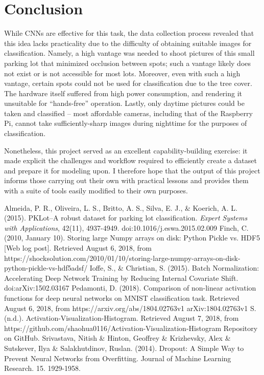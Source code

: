 \documentclass[a4paper, 11pt]{article} %
\begin{document}
\section{Conclusion}
	While CNNs are effective for this task, the data collection process 
	revealed that this idea lacks practicality due to the difficulty of 
	obtaining suitable images for classification. Namely, a high vantage was 
	needed to shoot pictures of this small parking lot that minimized occlusion 
	between spots; such a vantage likely does not exist or is not accessible 
	for most lots. Moreover, even with such a high vantage, certain spots could 
	not be used for classification due to the tree cover. The hardware itself 
	suffered from high power consumption, and rendering it unsuitable for 
	``hands-free'' operation. Lastly, only daytime pictures could be taken and 
	classified -- most affordable cameras, including that of the Raspberry Pi, 
	cannot take sufficiently-sharp images during nighttime for the purposes of 
	classification.
	
	\hspace*{-6mm}Nonetheless, this project served as an excellent 
	capability-building exercise: it made explicit the challenges and workflow 
	required to efficiently create a dataset and prepare it for modeling upon. 
	I therefore hope that the output of this project informs those carrying out 
	their own with practical lessons and provides them with a suite of tools 
	easily modified to their own purposes.
\newpage
\begin{thebibliography}{unsrt}
		Almeida, P. R., Oliveira, L. S., Britto, A. S., Silva, E. J., \& Koerich, A. L. (2015). PKLot--A robust 
		dataset for parking lot classification. \textit{Expert Systems with Applications}, 42(11), 
		4937-4949. doi:10.1016/j.eswa.2015.02.009
		Finch, C. (2010, January 10). Storing large Numpy arrays on disk: 
		Python Pickle vs. HDF5 [Web log post]. Retrieved August 6, 2018, from 
		https://shocksolution.com/2010/01/10/storing-large-numpy-arrays-on-disk-python-pickle-vs-hdf5adsf/
		Ioffe, S., \& Christian, S. (2015). Batch Normalization: Accelerating 
		Deep Network Training by Reducing Internal Covariate Shift. 
		doi:arXiv:1502.03167
		Pedamonti, D. (2018). Comparison of non-linear activation functions for 
		deep neural networks on MNIST classification task. Retrieved August 6, 
		2018, from https://arxiv.org/abs/1804.02763v1 arXiv:1804.02763v1
		S. (n.d.). Activation-Visualization-Histogram. Retrieved August 7, 
		2018, from 
		https://github.com/shaohua0116/Activation-Visualization-Histogram 
		Repository on GitHub.
		Srivastava, Nitish \& Hinton, Geoffrey \& Krizhevsky, Alex \& 
		Sutskever, Ilya \& Salakhutdinov, Ruslan. (2014). Dropout: A Simple Way 
		to Prevent Neural Networks from Overfitting. Journal of Machine 
		Learning Research. 15. 1929-1958.
\end{thebibliography}
\end{document}
